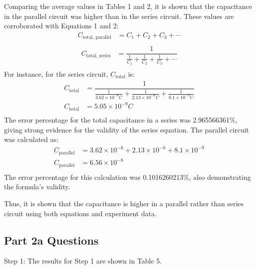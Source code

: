 \documentclass [12pt, letterpaper, twoside] {article}
\begin{document}
Comparing the average values in Tables 1 and 2, it is shown that the capacitance in the parallel circuit was higher than in the series circuit. These values are corroborated with Equations 1 and 2:
\begin{equation}
  \begin{split}
    C_{\text{total, parallel}} &= C_{1} + C_{2} + C_{3} + \cdots \\
  \end{split}
\end{equation}
\begin{equation}
  \begin{split}
    C_{\text{total, series}} &= \dfrac{1}{\tfrac{1}{C_{1}} + \tfrac{1}{C_{2}} + \tfrac{1}{C_{3}} + \cdots} \\
  \end{split}
\end{equation}
 For instance, for the series circuit, \(C_{\text{total}}\) is:
\begin{equation*}
  \begin{split}
    C_{\text{total}} &= \dfrac{1}{\tfrac{1}{3.62\times10^{-8}C} + \tfrac{1}{2.13\times10^{-8}C} + \tfrac{1}{8.1\times10^{-9}C}} \\
    C_{\text{total}} &= 5.05\times10^{-9}C \\ %
  \end{split}
\end{equation*}
The error percentage for the total capacitance in a series was 2.965566361\%, giving strong evidence for the validity of the series equation. The parallel circuit was calculated as:
\begin{equation*}
  \begin{split}
    C_{\text{parallel}} &= 3.62\times10^{-8} + 2.13\times10^{-8} + 8.1\times10^{-9} \\
    C_{\text{parallel}} &= 6.56\times10^{-8} \\
  \end{split}
\end{equation*}
The error percentage for this calculation was 0.1016260213\%, also demonstrating the formula's validity.

\noindent
Thus, it is shown that the capacitance is higher in a parallel rather than series circuit using both equations and experiment data.

\subsection* {Part 2a Questions}
Step 1: The results for Step 1 are shown in Table 5.
\end{document}
